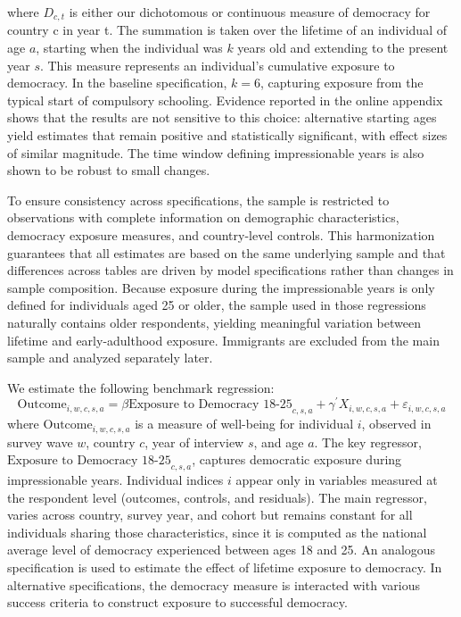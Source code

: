 \documentclass[11pt]{article}
\begin{document}
where $D_{c,t}$ is either our dichotomous or continuous measure of democracy for country c in year t. The summation is taken over the lifetime of an individual of age $a$, starting when the individual was $k$ years old and extending to the present year $s$. This measure represents an individual’s cumulative exposure to democracy. In the baseline specification, $k = 6$, capturing exposure from the typical start of compulsory schooling. Evidence reported in the online appendix shows that the results are not sensitive to this choice: alternative starting ages yield estimates that remain positive and statistically significant, with effect sizes of similar magnitude. The time window defining impressionable years is also shown to be robust to small changes.

To ensure consistency across specifications, the sample is restricted to observations with complete information on demographic characteristics, democracy exposure measures, and country-level controls. This harmonization guarantees that all estimates are based on the same underlying sample and that differences across tables are driven by model specifications rather than changes in sample composition. Because exposure during the impressionable years is only defined for individuals aged 25 or older, the sample used in those regressions naturally contains older respondents, yielding meaningful variation between lifetime and early-adulthood exposure. Immigrants are excluded from the main sample and analyzed separately later.

We estimate the following benchmark regression:
\begin{equation}
	\label{2}
	\text{Outcome}_{i,w,c,s,a} = \beta \text{Exposure to Democracy 18-25}_{c,s,a} + \gamma^{\prime}X_{i,w,c,s,a} + \varepsilon_{i,w,c,s,a} 
\end{equation}
where $\text{Outcome}_{i,w,c,s,a}$ is a measure of well-being for individual $i$, observed in survey wave $w$, country $c$, year of interview $s$, and age $a$. The key regressor, $\text{Exposure to Democracy 18-25}_{c,s,a}$, captures democratic exposure during impressionable years. Individual indices $i$ appear only in variables measured at the respondent level (outcomes, controls, and residuals). The main regressor, varies across country, survey year, and cohort but remains constant for all individuals sharing those characteristics, since it is computed as the national average level of democracy experienced between ages 18 and 25. An analogous specification is used to estimate the effect of lifetime exposure to democracy. In alternative specifications, the democracy measure is interacted with various success criteria to construct exposure to successful democracy. 
\end{document}
